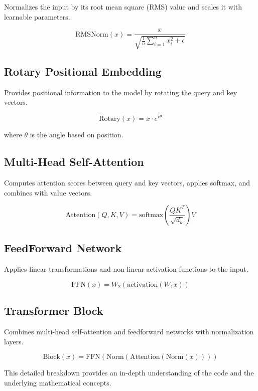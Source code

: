 Normalizes the input by its root mean square (RMS) value and scales it with learnable parameters.

\begin{equation}
\text{RMSNorm}(x) = \frac{x}{\sqrt{\frac{1}{n} \sum_{i=1}^n x_i^2 + \epsilon}}
\end{equation}

\subsection{Rotary Positional Embedding}

Provides positional information to the model by rotating the query and key vectors.

\begin{equation}
\text{Rotary}(x) = x \cdot e^{i \theta}
\end{equation}

where \( \theta \) is the angle based on position.

\subsection{Multi-Head Self-Attention}

Computes attention scores between query and key vectors, applies softmax, and combines with value vectors.

\begin{equation}
\text{Attention}(Q, K, V) = \text{softmax}\left(\frac{Q K^T}{\sqrt{d_k}}\right) V
\end{equation}

\subsection{FeedForward Network}

Applies linear transformations and non-linear activation functions to the input.

\begin{equation}
\text{FFN}(x) = W_2 (\text{activation}(W_1 x))
\end{equation}

\subsection{Transformer Block}

Combines multi-head self-attention and feedforward networks with normalization layers.

\begin{equation}
\text{Block}(x) = \text{FFN}(\text{Norm}(\text{Attention}(\text{Norm}(x))))
\end{equation}

This detailed breakdown provides an in-depth understanding of the code and the underlying mathematical concepts.

% 


